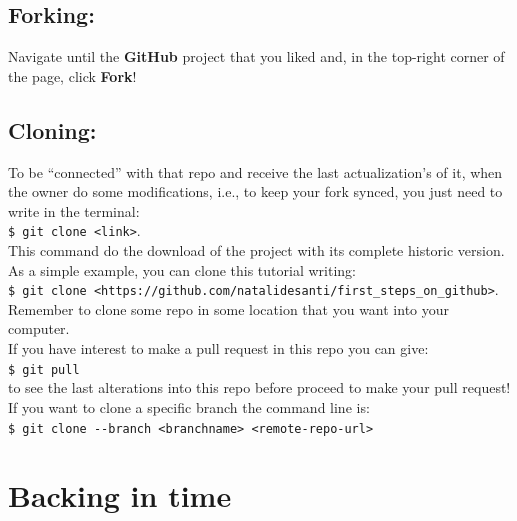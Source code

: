 \documentclass[12pt,a4paper,titlepage,brazil]{article}
\begin{document}
{\subsection{Forking:}

Navigate until the {\bf GitHub} project that you liked and, in the top-right corner of the page, click {\bf Fork}!

\subsection{Cloning:}

To be ``connected'' with that repo and receive the last actualization's of it, when the owner do some modifications, i.e., to keep your fork synced, you just need to write in the terminal:\\

\texttt{\$ git clone <link>}.\\

This command do the download of the project with its complete historic version. As a simple example, you can clone this tutorial writing:\\

\texttt{\$ git clone <https://github.com/natalidesanti/first\_steps\_on\_github>}.\\

Remember to clone some repo in some location that you want into your computer.\\

If you have interest to make a pull request in this repo you can give:\\

\texttt{\$ git pull}\\

to see the last alterations into this repo before proceed to make your pull request!\\

If you want to clone a specific branch the command line is:\\

\texttt{\$ git clone -\hspace{0.05cm}-branch <branchname> <remote-repo-url>}\\


\section{Backing in time}

}
\end{document}
